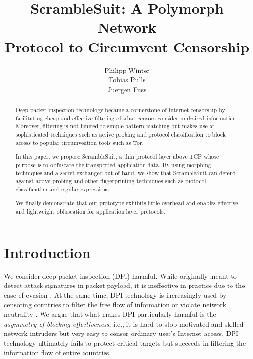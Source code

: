 \documentclass{sig-alternate}
\title{
	ScrambleSuit: A Polymorph Network \\
	Protocol to Circumvent Censorship
}
\newcommand{\pt}{\textsf{ScrambleSuit}}
\numberwithin{enumi}{section}
\numberwithin{notesctr}{section}
\begin{document}

\author{
	\alignauthor
		Philipp Winter \\[0.2cm]
	\alignauthor
		Tobias Pulls \\[0.2cm]
	\alignauthor
		Juergen Fuss \\[0.2cm]
}






\maketitle

\begin{abstract}
Deep packet inspection technology became a cornerstone of Internet censorship by facilitating cheap
and effective filtering of what censors consider undesired information. Moreover, filtering is not
limited to simple pattern matching but makes use of sophisticated techniques such as active probing
and protocol classification to block access to popular circumvention tools such as Tor.

In this paper, we propose \pt{}; a thin protocol layer above TCP whose purpose is to obfuscate the
transported application data. By using morphing techniques and a secret exchanged out-of-band, we
show that \pt{} can defend against active probing and other fingerprinting techniques such as
protocol classification and regular expressions.

We finally demonstrate that our prototype exhibits little overhead and enables effective and
lightweight obfuscation for application layer protocols.
\end{abstract}


\section{Introduction}
\label{sec:introduction}


We consider deep packet inspection (DPI) harmful. While originally meant to detect attack signatures
in packet payload, it is ineffective in practice due to the ease of evasion
\cite{Ptacek1998,Niemi2012,Handley2001}. At the same time, DPI technology is increasingly used by
censoring countries to filter the free flow of information or violate network neutrality
\cite{Dischinger2008}. We argue that what makes DPI particularly harmful is the \emph{asymmetry of
blocking effectiveness}, i.e., it is hard to stop motivated and skilled network intruders but very
easy to censor ordinary user's Internet access. DPI technology ultimately fails to protect critical
targets but succeeds in filtering the information flow of entire countries.
\end{document}
